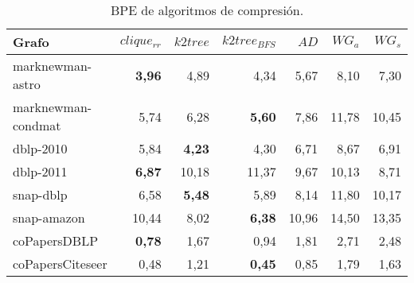 \begin{table}
	\caption{BPE de algoritmos de compresión.}
	\label{table:BPEcomp}
	\centering
	\begin{tabular}{l|r|r|r|r|r|r}
		\toprule
		Grafo & $clique_{rr}$ & $k2tree$ & $k2tree_{BFS}$ & $AD$ & $WG_{a}$ & $WG_{s}$\\
        \midrule
        marknewman-astro & \textbf{3,96} & 4,89 & 4,34 & 5,67 & 8,10 & 7,30\\
        marknewman-condmat & 5,74 & 6,28 & \textbf{5,60} & 7,86 & 11,78 & 10,45\\
        dblp-2010 & 5,84 & \textbf{4,23} & 4,30 & 6,71 & 8,67 & 6,91 \\
        dblp-2011 & \textbf{6,87} & 10,18 & 11,37 & 9,67 & 10,13 & 8,71 \\
        snap-dblp & 6,58 & \textbf{5,48} & 5,89 & 8,14 & 11,80 & 10,17 \\
        snap-amazon & 10,44 & 8,02 & \textbf{6,38} & 10,96 & 14,50 & 13,35 \\
        coPapersDBLP & \textbf{0,78} & 1,67 & 0,94 & 1,81 & 2,71 & 2,48 \\
        coPapersCiteseer & 0,48 & 1,21 & \textbf{0,45} & 0,85 & 1,79 &  1,63 \\
		\bottomrule
	\end{tabular}
\end{table}

